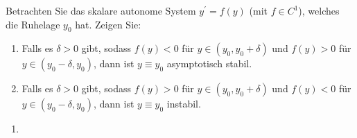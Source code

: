 \begin{exercise}
Betrachten Sie das skalare autonome System $y^{\prime} = f(y)$ (mit $f \in C^1$),
welches die Ruhelage $y_0$ hat. Zeigen Sie:
\begin{enumerate}[label = \textbf{\alph*)}]
  \item Falls es $\delta > 0$ gibt, sodass $f(y) < 0$ für $y \in (y_0,y_0 + \delta)$
und $f(y) > 0$ für $y \in (y_0 - \delta, y_0)$, dann ist $y \equiv y_0$
asymptotisch stabil.
\item Falls es $\delta > 0$ gibt, sodass $f(y) > 0$ für $y \in (y_0,y_0 + \delta)$
und $f(y) < 0$ für $y \in (y_0 - \delta, y_0)$, dann ist $y \equiv y_0$ instabil.
\end{enumerate}
\end{exercise}
\begin{solution}
\begin{enumerate}[label = \textbf{\alph*)}]
\item
\end{enumerate}
\end{solution}
